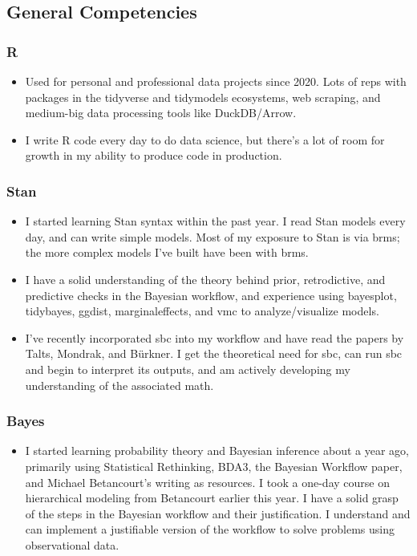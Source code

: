 \documentclass[
  letterpaper,
  DIV=11,
  numbers=noendperiod]{scrartcl}
\providecommand{\tightlist}{%
  \setlength{\itemsep}{0pt}\setlength{\parskip}{0pt}}\usepackage{longtable,booktabs,array}
\begin{document}
\subsection{General Competencies}\label{general-competencies}

\subsubsection{R}\label{r}

\begin{itemize}
\item
  Used for personal and professional data projects since 2020. Lots of
  reps with packages in the tidyverse and tidymodels ecosystems, web
  scraping, and medium-big data processing tools like DuckDB/Arrow.
\item
  I write R code every day to do data science, but there's a lot of room
  for growth in my ability to produce code in production.
\end{itemize}

\subsubsection{Stan}\label{stan}

\begin{itemize}
\item
  I started learning Stan syntax within the past year. I read Stan
  models every day, and can write simple models. Most of my exposure to
  Stan is via brms; the more complex models I've built have been with
  brms.
\item
  I have a solid understanding of the theory behind prior, retrodictive,
  and predictive checks in the Bayesian workflow, and experience using
  bayesplot, tidybayes, ggdist, marginaleffects, and vmc to
  analyze/visualize models.
\item
  I've recently incorporated sbc into my workflow and have read the
  papers by Talts, Mondrak, and Bürkner. I get the theoretical need for
  sbc, can run sbc and begin to interpret its outputs, and am actively
  developing my understanding of the associated math.
\end{itemize}

\subsubsection{Bayes}\label{bayes}

\begin{itemize}
\tightlist
\item
  I started learning probability theory and Bayesian inference about a
  year ago, primarily using Statistical Rethinking, BDA3, the Bayesian
  Workflow paper, and Michael Betancourt's writing as resources. I took
  a one-day course on hierarchical modeling from Betancourt earlier this
  year. I have a solid grasp of the steps in the Bayesian workflow and
  their justification. I understand and can implement a justifiable
  version of the workflow to solve problems using observational data.
\end{itemize}
\end{document}
